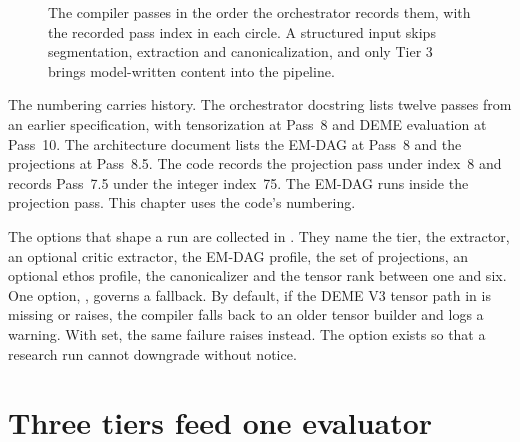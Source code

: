\begin{figure}[t]
\centering

\caption{The compiler passes in the order the orchestrator records them, with the recorded pass
index in each circle. A structured input skips segmentation, extraction and canonicalization, and
only Tier 3 brings model-written content into the pipeline.}
\label{fig:compiler-passes}
\end{figure}

The numbering carries history. The orchestrator docstring lists twelve passes from an earlier
specification, with tensorization at Pass~8 and DEME evaluation at Pass~10. The architecture
document lists the EM-DAG at Pass~8 and the projections at Pass~8.5. The code records the
projection pass under index~8 and records Pass~7.5 under the integer index~75. The EM-DAG runs
inside the projection pass. This chapter uses the code's numbering.

The options that shape a run are collected in . They name the tier, the
extractor, an optional critic extractor, the EM-DAG profile, the set of projections, an optional
ethos profile, the canonicalizer and the tensor rank between one and six. One option,
, governs a fallback. By default, if the DEME V3 tensor path in 
is missing or raises, the compiler falls back to an older tensor builder and logs a warning. With
 set, the same failure raises  instead. The option exists so
that a research run cannot downgrade without notice.

\section{Three tiers feed one evaluator}\label{sec:compiler-extraction}

